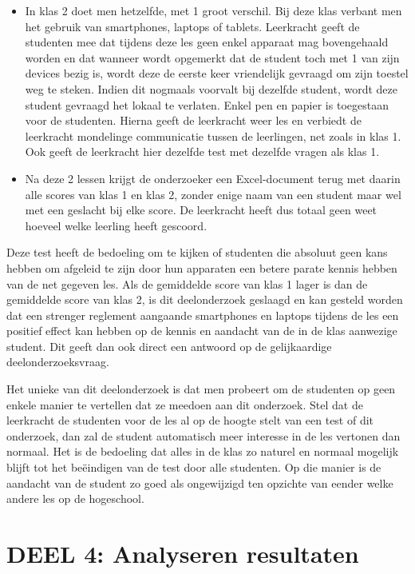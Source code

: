 \begin{itemize}
	\item In klas 2 doet men hetzelfde, met 1 groot verschil. Bij deze klas verbant men het gebruik van smartphones, laptops of tablets. Leerkracht geeft de studenten mee dat tijdens deze les geen enkel apparaat mag bovengehaald worden en dat wanneer wordt opgemerkt dat de student toch met 1 van zijn devices bezig is, wordt deze de eerste keer vriendelijk gevraagd om zijn toestel weg te steken. Indien dit nogmaals voorvalt bij dezelfde student, wordt deze student gevraagd het lokaal te verlaten. Enkel pen en papier is toegestaan voor de studenten. Hierna geeft de leerkracht weer les en verbiedt de leerkracht mondelinge communicatie tussen de leerlingen, net zoals in klas 1. Ook geeft de leerkracht hier dezelfde test met dezelfde vragen als klas 1. 
	\item Na deze 2 lessen krijgt de onderzoeker een Excel-document terug met daarin alle scores van klas 1 en klas 2, zonder enige naam van een student maar wel met een geslacht bij elke score. De leerkracht heeft dus totaal geen weet hoeveel welke leerling heeft gescoord.
\end{itemize}

Deze test heeft de bedoeling om te kijken of studenten die absoluut geen kans hebben om afgeleid te zijn door hun apparaten een betere parate kennis hebben van de net gegeven les. Als de gemiddelde score van klas 1 lager is dan de gemiddelde score van klas 2, is dit deelonderzoek geslaagd en kan gesteld worden dat een strenger reglement aangaande smartphones en laptops tijdens de les een positief effect kan hebben op de kennis en aandacht van de in de klas aanwezige student. Dit geeft dan ook direct een antwoord op de gelijkaardige deelonderzoeksvraag.

Het unieke van dit deelonderzoek is dat men probeert om de studenten op geen enkele manier te vertellen dat ze meedoen aan dit onderzoek. Stel dat de leerkracht de studenten voor de les al op de hoogte stelt van een test of dit onderzoek, dan zal de student automatisch meer interesse in de les vertonen dan normaal. Het is de bedoeling dat alles in de klas zo naturel en normaal mogelijk blijft tot het beëindigen van de test door alle studenten. Op die manier is de aandacht van de student zo goed als ongewijzigd ten opzichte van eender welke andere les op de hogeschool. 

\section{DEEL 4: Analyseren resultaten}
\label{sec:analyse}

